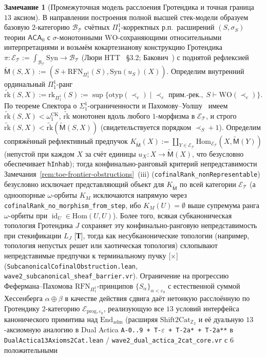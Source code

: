 \documentclass[11pt]{article}
\theoremstyle{plain}
\theoremstyle{definition}
\newtheorem{remark}[theorem]{Замечание}
\newcommand{\Hom}{\mathrm{Hom}}
\newcommand{\Syn}{\mathrm{Syn}}
\DeclareMathOperator{\id}{id}
\begin{document}
\begin{remark}[Промежуточная модель расслоения Гротендика и точная граница $13$ аксиом]\label{rem:grothendieck-intermediate-model}
В направлении построения полной высшей стек-модели образуем базовую $2$-категорию $\mathcal{B}_{\mathcal{T}}$ счётных $\Pi_1^1$-корректных р.п.\ расширений $(S, \sigma_S)$ теории $\mathsf{ACA}_0$ с $\sigma$-монотонными $\mathrm{WO}$-сохраняющими относительными интерпретациями и возьмём кокартезианову конструкцию Гротендика $\pi : \mathcal{E}_{\mathcal{T}} := \int_{\mathcal{B}_{\mathcal{T}}} \Syn \to \mathcal{B}_{\mathcal{T}}$ (Люри HTT~\cite{LurieHTT} \S 3.2; Бакович~\cite{Bakovic2010}) с поднятой рефлексией $\widetilde{\mathsf{M}}(S, X) := (S + \mathrm{RFN}_{\Pi_1^1}(S), \Syn(u_S)(X))$. Определим внутренний ординальный $\Pi_1^1$-ранг $\widetilde{\mathrm{rk}}(S, X) := \mathrm{rk}_{\Pi_1^1}(S) := \sup\{\mathrm{otyp}(\prec_e) \mid \prec_e \text{ прим.-рек.},\; S \vdash \mathrm{WO}(\prec_e)\}$. По теореме Спектора о $\Sigma_1^1$-ограниченности и Пахомову--Уолшу~\cite{PakhomovWalsh2021} имеем $\widetilde{\mathrm{rk}}(S, X) < \omega_1^{\mathrm{CK}}$, $\widetilde{\mathrm{rk}}$ монотонен вдоль любого $1$-морфизма в $\mathcal{E}_{\mathcal{T}}$, и строго $\widetilde{\mathrm{rk}}(S, X) < \widetilde{\mathrm{rk}}(\widetilde{\mathsf{M}}(S, X))$ (свидетельствуется порядком $\prec_S + 1$). Определим сопряжённый рефлективный предпучок $K_{\widetilde{\mathsf{M}}}(X) := \coprod_{Y \in \mathcal{E}_{\mathcal{T}}} \Hom_{\mathcal{E}_{\mathcal{T}}}(X, \widetilde{\mathsf{M}}(Y))$ (непустой при каждом $X$ за счёт единицы $u_X : X \to \widetilde{\mathsf{M}}(X)$, что безусловно обеспечивает \texttt{hInhab}); тогда конфинально-ранговый критерий непредставимости Замечания~\ref{rem:toe-frontier-obstructions}~(iii) (\texttt{cofinalRank\_\allowbreak nonRepresentable}) безусловно исключает представляющий объект для $K_{\widetilde{\mathsf{M}}}$ по всей категории $\mathcal{E}_{\mathcal{T}}$ (а одноопорные $\omega$-орбиты $K_M$ исключаются напрямую через \texttt{cofinalRank\_\allowbreak no\_\allowbreak morphism\_\allowbreak from\_\allowbreak step}, ибо $K_M(U) = \emptyset$ выше супремума ранга $\omega$-орбиты при $\id_U \in \Hom(U, U)$). Более того, всякая субканоническая топология Гротендика $J$ сохраняет эту конфинально-ранговую непредставимость при стекификации $L_J$ \textup{[\textbf{Т}]}, тогда как несубканонические топологии (например, топология непустых решет или хаотическая топология) схлопывают непредставимые предпучки к терминальному пучку \textup{[\textbf{$\times$}]} (\texttt{SubcanonicalCofinalObstruction.lean}, \texttt{wave2\_subcanonical\_sheaf\_barrier.vr}). Ограничение на прогрессию Фефермана--Пахомова $\mathrm{RFN}_{\Pi_1^1}$-принципов $\{S_\alpha\}_{\alpha < \varepsilon_0}$ с естественной суммой Хессенберга $\alpha \oplus \beta$ в качестве действия сдвига даёт нетонкую расслоённую по Гротендику $2$-категорию $\mathcal{E}_{\mathrm{prog}, \varepsilon_0}$, реализующую все $13$ условий интерфейса канонического примитива над $\mathrm{End}_{\mathrm{adm}}$ (расширяя $\mathrm{Shift2Cat}_{\mathbb{Z}_2}$ и её дуальную $13$-аксиомную аналогию в Dual Actica \texttt{A-0..9 + T-$\varepsilon$ + T-2a* + T-2a**} в \texttt{DualActica13Axioms2Cat.lean} / \texttt{wave2\_dual\_actica\_2cat\_core.vr} с $6$ положительными 
\end{remark}
\end{document}
